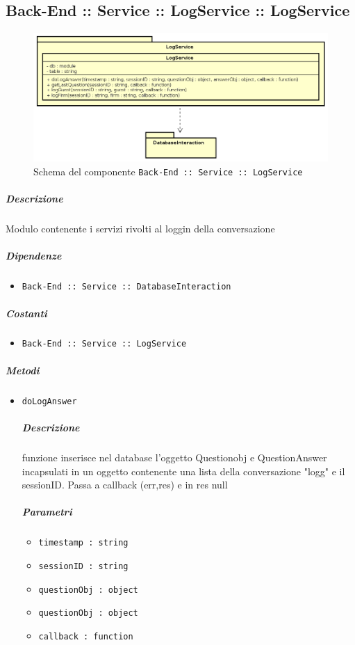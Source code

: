 \documentclass[../ManualeSviluppatore_v2.0.0.tex]{subfiles}
\begin{document}
\subsection{Back-End :: Service :: LogService :: LogService}
\begin{figure}[!h]
	\centering
	\includegraphics[scale=0.6]{Architettura/Back-End/Service/LogService.png}
	\caption{Schema del componente \texttt{Back-End :: Service :: LogService}}
\end{figure}
\subparagraph{Descrizione} Modulo contenente i servizi rivolti al loggin della conversazione
\subparagraph{Dipendenze}
\begin{itemize}
	\item \texttt{Back-End :: Service :: DatabaseInteraction}
\end{itemize}
\subparagraph{Costanti}
\begin{itemize}
	\item \texttt{Back-End :: Service :: LogService}
\end{itemize}
\subparagraph{Metodi}\begin{itemize}
\item \texttt{doLogAnswer}
\subparagraph{Descrizione}funzione inserisce nel database l'oggetto Questionobj e QuestionAnswer incapsulati in un oggetto contenente una lista della conversazione "logg" e il sessionID. Passa a callback (err,res) e in res null
\subparagraph{Parametri}
\begin{itemize}
	\item \texttt{timestamp : string}
	\item \texttt{sessionID : string}
	\item \texttt{questionObj : object}
	\item \texttt{questionObj : object}
	\item \texttt{callback : function}
\end{itemize}
\end{itemize}
\end{document}
